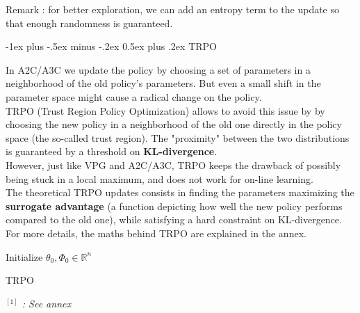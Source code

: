\documentclass[10pt,landscape]{article}
\makeatletter
\renewcommand{\section}{\@startsection{section}{1}{0mm}%
                                {-1ex plus -.5ex minus -.2ex}%
                                {0.5ex plus .2ex}%
                                {\normalfont\large\bfseries}}
\makeatother
\begin{document}
\begin{multicols}{3}
\smallskip
Remark : for better exploration, we can add an entropy term to the update so that enough randomness is guaranteed.




\section{TRPO}

In A2C/A3C we update the policy by choosing a set of parameters in a neighborhood of the old policy's parameters. But even a small shift in the parameter space might cause a radical change on the policy.\\
TRPO (Trust Region Policy Optimization) allows to avoid this issue by by choosing the new policy in a neighborhood of the old one directly in the policy space (the so-called trust region). The "proximity" between the two distributions is guaranteed by a threshold on \textbf{KL-divergence}.\\
However, just like VPG and A2C/A3C, TRPO keeps the drawback of possibly being stuck in a local maximum, and does not work for on-line learning.\\
The theoretical TRPO updates consists in finding the parameters maximizing the \textbf{surrogate advantage} (a function depicting how well the new policy performs compared to the old one), while satisfying a hard constraint on KL-divergence. For more details, the maths behind TRPO are explained in the annex.
\medskip


\begin{algorithm}[H]
 Initialize $\theta_0, \Phi_0 \in \mathbb{R}^n$\\
\caption{TRPO}
\end{algorithm}
\begingroup
    \fontsize{5pt}{8pt}
        \textit{$^{[1]}$ : See annex}
\endgroup



\end{multicols}
\end{document}
